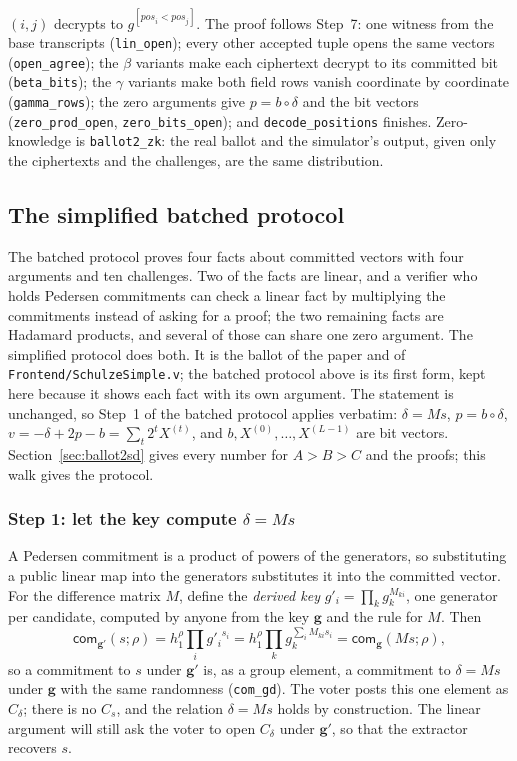 \documentclass[11pt,a4paper]{article}
\newcommand{\com}{\mathsf{com}}
\newcommand{\rocq}[1]{\texttt{#1}}
\theoremstyle{remark}
\begin{document}
$(i, j)$ decrypts to $g^{[\mathit{pos}_i < \mathit{pos}_j]}$. The proof
follows Step~7: one witness from the base transcripts (\rocq{lin\_open});
every other accepted tuple opens the same vectors (\rocq{open\_agree});
the $\beta$ variants make each ciphertext decrypt to its committed bit
(\rocq{beta\_bits}); the $\gamma$ variants make both field rows vanish
coordinate by coordinate (\rocq{gamma\_rows}); the zero arguments give $p
= b \circ \delta$ and the bit vectors (\rocq{zero\_prod\_open},
\rocq{zero\_bits\_open}); and \rocq{decode\_positions} finishes.
Zero-knowledge is \rocq{ballot2\_zk}: the real ballot and the simulator's
output, given only the ciphertexts and the challenges, are the same
distribution.

\subsection{The simplified batched protocol}\label{sec:steps3}
The batched protocol proves four facts about committed vectors with four
arguments and ten challenges. Two of the facts are linear, and a verifier
who holds Pedersen commitments can check a linear fact by multiplying the
commitments instead of asking for a proof; the two remaining facts are
Hadamard products, and several of those can share one zero argument. The
simplified protocol does both. It is the ballot of the paper and of
\rocq{Frontend/SchulzeSimple.v}; the batched protocol above is its first
form, kept here because it shows each fact with its own argument. The
statement is unchanged, so Step~1 of the batched protocol applies
verbatim: $\delta = Ms$, $p = b \circ \delta$, $v = -\delta + 2p - b =
\sum_t 2^t X^{(t)}$, and $b, X^{(0)}, \ldots, X^{(L-1)}$ are bit vectors.
Section~\ref{sec:ballot2sd} gives every number for $A > B > C$ and the
proofs; this walk gives the protocol.

\subsubsection*{Step 1: let the key compute $\delta = Ms$}
A Pedersen commitment is a product of powers of the generators, so
substituting a public linear map into the generators substitutes it into
the committed vector. For the difference matrix $M$, define the
\emph{derived key} $g'_i = \prod_k g_k^{M_{ki}}$, one generator per
candidate, computed by anyone from the key $\mathbf{g}$ and the rule for
$M$. Then
\[
  \com_{\mathbf{g}'}(s; \rho) = h_1^{\rho} \prod_i {g'_i}^{s_i}
  = h_1^{\rho} \prod_k g_k^{\sum_i M_{ki} s_i} = \com_{\mathbf{g}}(Ms; \rho),
\]
so a commitment to $s$ under $\mathbf{g}'$ is, as a group element, a
commitment to $\delta = Ms$ under $\mathbf{g}$ with the same randomness
(\rocq{com\_gd}). The voter posts this one element as $C_\delta$; there
is no $C_s$, and the relation $\delta = Ms$ holds by construction. The
linear argument will still ask the voter to open $C_\delta$ under
$\mathbf{g}'$, so that the extractor recovers $s$.
\end{document}

